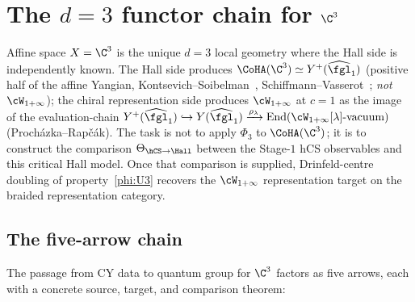 \section{The \texorpdfstring{$d = 3$}{d = 3} functor chain for \texorpdfstring{$\C^3$}{C-3}}
\label{sec:d3-functor-chain}

Affine space $X = \C^3$ is the unique $d = 3$ local geometry where the
Hall side is independently known. The Hall side produces
$\CoHA(\C^3) \simeq Y^+(\widehat{\fgl}_1)$ \textup{(}positive half of the
affine Yangian, Kontsevich--Soibelman~\cite{KS2008},
Schiffmann--Vasserot~\cite{SV2013}; \emph{not}
$\cW_{1+\infty}$\textup{);} the chiral representation side produces
$\cW_{1+\infty}$ at $c = 1$ as the image of the evaluation-chain
$Y^+(\widehat{\fgl}_1) \hookrightarrow Y(\widehat{\fgl}_1)
\xrightarrow{\rho_\lambda}
\mathrm{End}(\cW_{1+\infty}[\lambda]\text{-vacuum})$
\textup{(}Proch\'azka--Rap\v{c}\'ak\textup{).} The task is not to apply
$\Phi_3$ to $\CoHA(\C^3)$; it is to construct the comparison
$\Theta_{\hCS\to\Hall}$ between the Stage-$1$ hCS observables and this
critical Hall model. Once that comparison is supplied, Drinfeld-centre
doubling of property~\eqref{phi:U3} recovers the $\cW_{1+\infty}$
representation target on the braided representation category.


\subsection{The five-arrow chain}
\label{subsec:five-arrow-chain}

The passage from CY data to quantum group for $\C^3$ factors as five
arrows, each with a concrete source, target, and comparison theorem:

